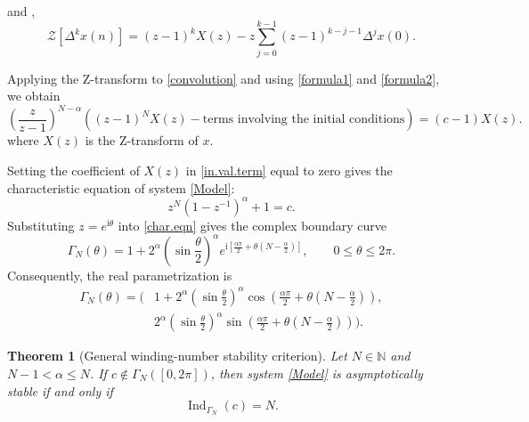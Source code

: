 \documentclass[11pt,a4paper]{article}
\newtheorem{thm}{Theorem}[section]
\theoremstyle{definition}
\begin{document}
and \cite{elaydi2005introduction},
\begin{equation}
	\mathcal{Z}[\Delta^k x(n)] = (z - 1)^k X(z)
	- z\sum_{j=0}^{k-1}(z - 1)^{k-j-1}\Delta^j x(0). \label{formula2}
\end{equation}

Applying the Z-transform to \eqref{convolution} and using \eqref{formula1} and \eqref{formula2}, we obtain
\begin{equation}
	\left(\frac{z}{z - 1}\right)^{N-\alpha}
	\left((z - 1)^N X(z) - \text{terms involving the initial conditions}\right)
	= (c - 1)X(z). \label{in.val.term}
\end{equation}  
where $X(z)$ is the Z-transform of $x$.

Setting the coefficient of $X(z)$ in \eqref{in.val.term} equal to zero gives the characteristic equation of system \eqref{Model}:
\begin{equation}
	z^N(1 - z^{-1})^{\alpha} + 1 = c. \label{char.eqn}
\end{equation}
Substituting $z = e^{\mathrm{i}\theta}$ into \eqref{char.eqn} gives the complex boundary curve
\begin{equation}\label{Gamma-complex}
\Gamma_N(\theta)
=1+2^\alpha\left(\sin\frac{\theta}{2}\right)^\alpha
e^{\mathrm{i}\left[\frac{\alpha\pi}{2}+\theta\left(N-\frac{\alpha}{2}\right)\right]},
\qquad 0\leq\theta\leq2\pi.
\end{equation}
Consequently, the real parametrization is
\begin{align}
\Gamma_N(\theta)=\Biggl(&1+2^\alpha\left(\sin\frac{\theta}{2}\right)^\alpha
\cos\left(\frac{\alpha\pi}{2}+\theta\left(N-\frac{\alpha}{2}\right)\right), \nonumber\\
&2^\alpha\left(\sin\frac{\theta}{2}\right)^\alpha
\sin\left(\frac{\alpha\pi}{2}+\theta\left(N-\frac{\alpha}{2}\right)\right)\Biggr).
\label{Gammacurve}
\end{align}

\begin{thm}[General winding-number stability criterion]\label{thm:general-stability}
Let $N\in\mathbb{N}$ and $N-1<\alpha\leq N$. If $c\notin\Gamma_N([0,2\pi])$, then system \eqref{Model} is asymptotically stable if and only if
\begin{equation}\label{general-index}
\operatorname{Ind}_{\Gamma_N}(c)=N.
\end{equation}
\end{thm}
\end{document}
